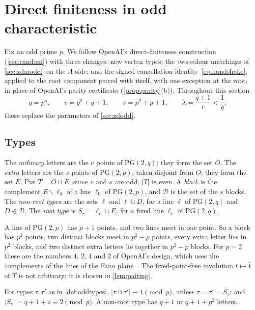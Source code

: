 \documentclass[11pt]{article}
\theoremstyle{definition}
\theoremstyle{plain}
\newcommand{\PG}{\mathrm{PG}}
\begin{document}
\section{Direct finiteness in odd characteristic}\label{sec:dfodd}

Fix an odd prime $p$. We follow OpenAI's direct-finiteness construction~\cite{OAI197a} (\cref{sec:random}) with three changes: new vertex types; the two-colour matchings of \cref{sec:zdmodel} on the $A$-side; and the signed cancellation identity~\eqref{eq:handshake}, applied to the root component paired with itself, with one exception at the root, in place of OpenAI's parity certificate (\cref{prop:parity}(b)). Throughout this section
\begin{equation}\label{eq:oddparams}
q=p^5,\qquad v=q^2+q+1,\qquad s=p^2+p+1,\qquad \lambda=\frac{q+1}{v}<\frac1q;
\end{equation}
these replace the parameters of \cref{sec:zdodd}.

\subsection{Types}

\begin{definition}\label{def:oddtypes}
The \emph{ordinary} letters are the $v$ points of $\PG(2,q)$; they form the set $O$. The \emph{extra} letters are the $s$ points of $\PG(2,p)$, taken disjoint from $O$; they form the set $E$. Put $T=O\sqcup E$; since $v$ and $s$ are odd, $|T|$ is even. A \emph{block} is the complement $E\smallsetminus\ell_0$ of a line $\ell_0$ of $\PG(2,p)$, and $\mathcal D$ is the set of the $s$ blocks. The \emph{non-root types} are the sets $\ell$ and $\ell\cup D$, for a line $\ell$ of $\PG(2,q)$ and $D\in\mathcal D$. The \emph{root type} is $S_r=\ell_r\cup E$, for a fixed line $\ell_r$ of $\PG(2,q)$.
\end{definition}

A line of $\PG(2,p)$ has $p+1$ points, and two lines meet in one point. So a block has $p^2$ points, two distinct blocks meet in $p^2-p$ points, every extra letter lies in $p^2$ blocks, and two distinct extra letters lie together in $p^2-p$ blocks. For $p=2$ these are the numbers $4$, $2$, $4$ and $2$ of OpenAI's design, which uses the complements of the lines of the Fano plane~\cite[\S3.1]{OAI197a}. The fixed-point-free involution $t\mapsto\bar t$ of $T$ is not arbitrary; it is chosen in \cref{lem:pairing}.

\begin{lemma}\label{lem:oddcong}
For types $\tau,\tau'$ as in \cref{def:oddtypes}, $|\tau\cap\tau'|\equiv1\pmod p$, unless $\tau=\tau'=S_r$; and $|S_r|=q+1+s\equiv2\pmod p$. A non-root type has $q+1$ or $q+1+p^2$ letters.
\end{lemma}
\end{document}
